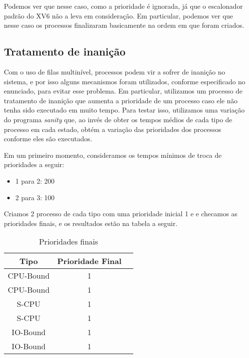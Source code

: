 \documentclass{article}
\begin{document}
Podemos ver que nesse caso, como a prioridade é ignorada, já que o escalonador
padrão do XV6 não a leva em consideração.
Em particular, podemos ver que nesse caso os processos
finalizaram basicamente na ordem em que foram criados.

\subsection{Tratamento de inanição}

Com o uso de filas multinível, processos podem vir a sofrer de inanição no
sistema, e por isso alguns mecanismos foram utilizados, conforme especificado
no enunciado, para evitar esse problema. Em particular, utilizamos um processo
de tratamento de inanição que aumenta a prioridade de um processo caso ele não
tenha
sido executado em muito tempo. Para testar isso, utilizamos uma variação do
programa \textit{sanity} que, ao invés de obter os tempos médios de cada tipo
de processo em cada estado, obtém a variação das prioridades dos processos
conforme eles são executados.

Em um primeiro momento, consideramos os tempos mínimos de troca de
prioridades a seguir:

\begin{itemize}
      \item 1 para 2: 200
      \item 2 para 3: 100
\end{itemize}

Criamos 2 processo de cada tipo com uma prioridade inicial 1 e e checamos as
prioridades finais, e os resultados estão na tabela a seguir.

\begin{table}[H]
      \centering
      \begin{tabular}{|c|c|c|}
            \hline
            \textbf{Tipo} & \textbf{Prioridade Final} \\
            \hline
            CPU-Bound     & 1                         \\
            CPU-Bound     & 1                         \\
            S-CPU         & 1                         \\
            S-CPU         & 1                         \\
            IO-Bound      & 1                         \\
            IO-Bound      & 1                         \\
            \hline
      \end{tabular}
      \caption{Prioridades finais}
\end{table}
\end{document}
